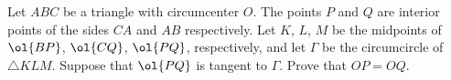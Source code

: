 Let $ABC$ be a triangle with circumcenter $O$.
The points $P$ and $Q$ are interior points of the sides $CA$ and $AB$ respectively.
Let $K$, $L$, $M$ be the midpoints of $\ol{BP}$, $\ol{CQ}$, $\ol{PQ}$,
respectively, and let $\Gamma$ be the circumcircle of $\triangle KLM$.
Suppose that $\ol{PQ}$ is tangent to $\Gamma$. Prove that $OP = OQ$.
